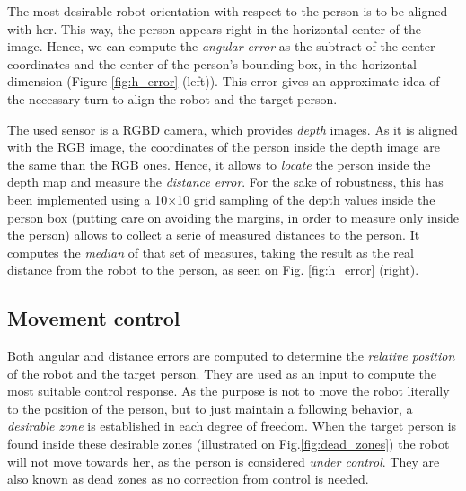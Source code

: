 The most desirable robot orientation with respect to the person is to be aligned with her. This way, the person appears right in the horizontal center of the image. Hence, we can compute the \emph{angular error} as the subtract of the center coordinates and the center of the person's bounding box, in the horizontal dimension (Figure \ref{fig:h_error} (left)). This error gives an approximate idea of the necessary turn to align the robot and the target person.
	
The used sensor is a RGBD camera, which provides \emph{depth} images. As it is aligned with the RGB image, the coordinates of the person inside the depth image are the same than the RGB ones. Hence, it allows to \emph{locate} the person inside the depth map and measure the \emph{distance error}. For the sake of robustness, this has been implemented using a 10$\times$10 grid sampling of the depth values inside the person box (putting care on avoiding the margins, in order to measure only inside the person) allows to collect a serie of measured distances to the person. It computes the \emph{median} of that set of measures, taking the result as the real distance from the robot to the person, as seen on Fig. \ref{fig:h_error} (right). 

\subsection{Movement control}

Both angular and distance errors are computed to determine the \emph{relative position} of the robot and the target person. They are used as an input to compute the most suitable control response. As the purpose is not to move the robot literally to the position of the person, but to just maintain a following behavior, a \emph{desirable zone} is established in each degree of freedom. When the target person is found inside these desirable zones (illustrated on Fig.\ref{fig:dead_zones}) the robot will not move towards her, as the person is considered \emph{under control}. They are also known as dead zones as no correction from control is needed. 

